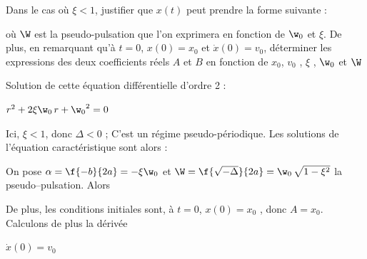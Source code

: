 \documentclass[a4paper, 10pt, garamond]{book}
\begin{document}
\QR
{Dans le cas où  $\xi < 1$, justifier que $x\left(t\right)$ peut prendre la forme suivante :

                                                           
où $\W$ est la pseudo-pulsation que l’on exprimera en fonction de $\w_0$ et $\xi$.
De plus, en remarquant qu’à $t=0$, $x\left(0\right)=x_0$ et $\dot{x}\left(0\right)=v_0$, déterminer les expressions des deux coefficients réels $A$ et $B$ en fonction de $x_0$, $v_0$ , $\xi$ , $\w_0$ et $\W$}
{
Solution de cette équation différentielle d’ordre 2 :

 
 {$r^2+2\xi\w_0 \, r+{\w_0}^2=0$}



\noindent
Ici, $\xi<1$, donc $\Delta <0$ ; C’est un régime pseudo-périodique.	Les solutions de l’équation caractéristique sont alors : 


\noindent
On pose   $\alpha=\f{-b}{2a}  = -\xi\w_0$	et $\W=\f{\sqrt{-\Delta}}{2a}= \w_0 \, \sqrt{1-\xi^2}$ la pseudo–pulsation. Alors

 
	
De plus, les conditions initiales sont, à $t=0$, $x\left(0\right)=x_0$ , donc $A=x_0$. 
Calculons de plus la dérivée 



 {$\dot{x}\left(0\right)=v_0$} 


}
\end{document}
